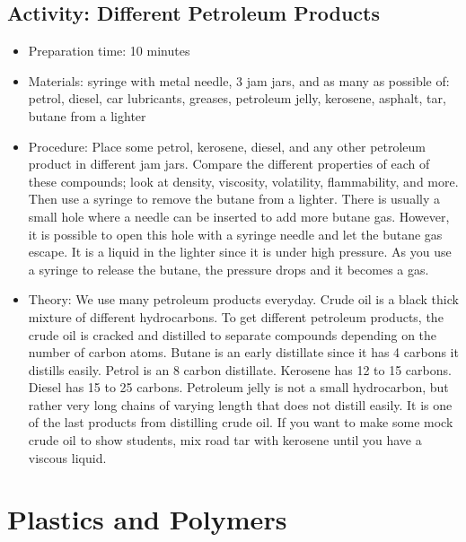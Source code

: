 \begin{itemize}
{\begin{itemize}
\begin{itemize}
{\subsection{Activity: Different Petroleum Products}
\begin{itemize}
\item{Preparation time: 10 minutes}
\item{Materials: syringe with metal needle, 3 jam jars, and as many as possible of: petrol, diesel, car lubricants, greases, petroleum jelly, kerosene, asphalt, tar, butane from a lighter}
\item{Procedure: Place some petrol, kerosene, diesel, and any other petroleum product in different jam jars. Compare the different properties of each of these compounds; look at density, viscosity, volatility, flammability, and more. Then use a syringe to remove the butane from a lighter. There is usually a small hole where a needle can be inserted to add more butane gas. However, it is possible to open this hole with a syringe needle and let the butane gas escape. It is a liquid in the lighter since it is under high pressure. As you use a syringe to release the butane, the pressure drops and it becomes a gas.}
\item{Theory: We use many petroleum products everyday. Crude oil is a black thick mixture of different hydrocarbons. To get different petroleum products, the crude oil is cracked and distilled to separate compounds depending on the number of carbon atoms. Butane is an early distillate since it has 4 carbons it distills easily. Petrol is an 8 carbon distillate. Kerosene has 12 to 15 carbons. Diesel has 15 to 25 carbons. Petroleum jelly is not a small hydrocarbon, but rather very long chains of varying length that does not distill easily. It is one of the last products from distilling crude oil. If you want to make some mock crude oil to show students, mix road tar with kerosene until you have a viscous liquid.}
\end{itemize}

\section{Plastics and Polymers}

}
\end{itemize}
\end{itemize}}
\end{itemize}
